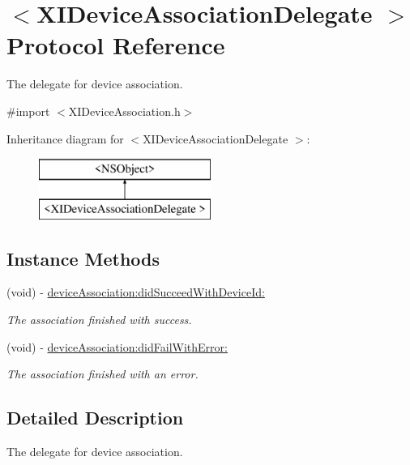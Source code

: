\hypertarget{protocol_x_i_device_association_delegate_01-p}{}\section{$<$X\+I\+Device\+Association\+Delegate $>$ Protocol Reference}
\label{protocol_x_i_device_association_delegate_01-p}


The delegate for device association.  




{\ttfamily \#import $<$X\+I\+Device\+Association.\+h$>$}

Inheritance diagram for $<$X\+I\+Device\+Association\+Delegate $>$\+:\begin{figure}[H]
\begin{center}
\leavevmode
\includegraphics[height=2.000000cm]{protocol_x_i_device_association_delegate_01-p}
\end{center}
\end{figure}
\subsection*{Instance Methods}
\begin{DoxyCompactItemize}
\item 
(void) -\/ \hyperlink{protocol_x_i_device_association_delegate_01-p_a8c02d311ae8e3fdc4995e5ca646a527a}{device\+Association\+:did\+Succeed\+With\+Device\+Id\+:}
\begin{DoxyCompactList}\small\item\em The association finished with success. \end{DoxyCompactList}\item 
(void) -\/ \hyperlink{protocol_x_i_device_association_delegate_01-p_af6d8945d9ace459debaec57a199b1f14}{device\+Association\+:did\+Fail\+With\+Error\+:}
\begin{DoxyCompactList}\small\item\em The association finished with an error. \end{DoxyCompactList}\end{DoxyCompactItemize}


\subsection{Detailed Description}
The delegate for device association. 


